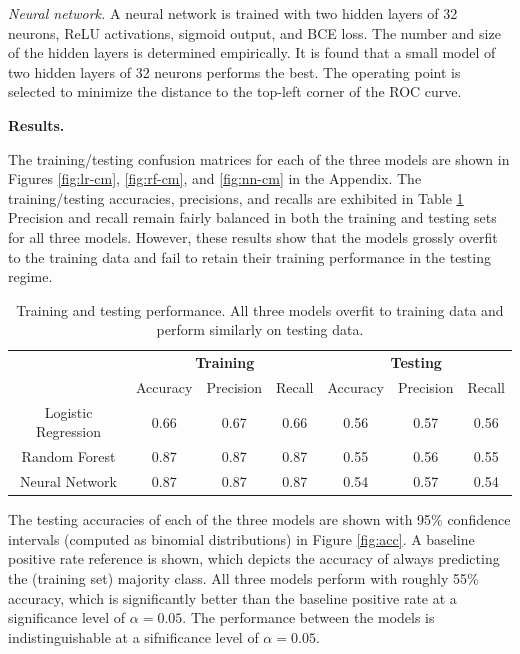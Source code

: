 \documentclass[12pt]{article}
\begin{document}
\textit{Neural network.} A neural network is trained with two hidden layers of 32 neurons, ReLU activations, sigmoid output, and BCE loss. The number and size of the hidden layers is determined empirically. It is found that a small model of two hidden layers of 32 neurons performs the best. The operating point is selected to minimize the distance to the top-left corner of the ROC curve.

\textbf{Results.}

The training/testing confusion matrices for each of the three models are shown in Figures \ref{fig:lr-cm}, \ref{fig:rf-cm}, and \ref{fig:nn-cm} in the Appendix. The training/testing accuracies, precisions, and recalls are exhibited in Table \ref{tab:performance} Precision and recall remain fairly balanced in both the training and testing sets for all three models. However, these results show that the models grossly overfit to the training data and fail to retain their training performance in the testing regime.

\begin{table}[h!]
\centering
\begin{tabular}{c|ccc|ccc}
    & \multicolumn{3}{c|}{\textbf{Training}} & \multicolumn{3}{c}{\textbf{Testing}} \\ 
    & Accuracy & Precision & Recall & Accuracy & Precision & Recall \\ 
    \hline
    Logistic Regression & 0.66 & 0.67 & 0.66 & 0.56 & 0.57 & 0.56 \\ 
    Random Forest & 0.87 & 0.87 & 0.87 & 0.55 & 0.56 & 0.55 \\ 
    Neural Network & 0.87 & 0.87 & 0.87 & 0.54 & 0.57 & 0.54 \\ 
\end{tabular}
\caption{Training and testing performance. All three models overfit to training data and perform similarly on testing data.}
\label{tab:performance}
\end{table}


The testing accuracies of each of the three models are shown with 95\% confidence intervals (computed as binomial distributions) in Figure \ref{fig:acc}. A baseline positive rate reference is shown, which depicts the accuracy of always predicting the (training set) majority class. All three models perform with roughly 55\% accuracy, which is significantly better than the baseline positive rate at a significance level of $\alpha = 0.05$. The performance between the models is indistinguishable at a sifnificance level of $\alpha = 0.05$.
\end{document}
